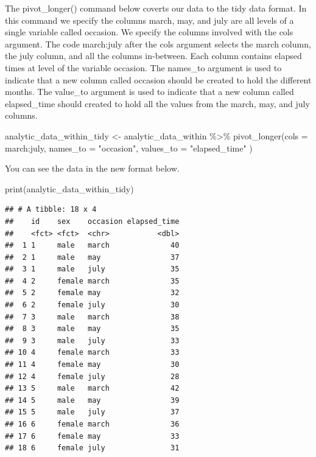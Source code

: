 \documentclass[
]{krantz}
\makeatletter
\newenvironment{Shaded}{\begin{snugshade}}{\end{snugshade}}
\newcommand{\AttributeTok}[1]{\textcolor[rgb]{0.61,0.61,0.61}{#1}}
\newcommand{\FunctionTok}[1]{\textcolor[rgb]{0,0,0}{#1}}
\newcommand{\NormalTok}[1]{#1}
\newcommand{\OtherTok}[1]{\textcolor[rgb]{0.37,0.37,0.37}{#1}}
\newcommand{\SpecialCharTok}[1]{\textcolor[rgb]{0,0,0}{#1}}
\newcommand{\StringTok}[1]{\textcolor[rgb]{0.5,0.5,0.5}{#1}}
\newenvironment{kframe}{%
\medskip{}
\setlength{\fboxsep}{.8em}
 \def\at@end@of@kframe{}%
 \ifinner\ifhmode%
  \def\at@end@of@kframe{\end{minipage}}%
  \begin{minipage}{\columnwidth}%
 \fi\fi%
 \def\FrameCommand##1{\hskip\@totalleftmargin \hskip-\fboxsep
 \colorbox{shadecolor}{##1}\hskip-\fboxsep
     \hskip-\linewidth \hskip-\@totalleftmargin \hskip\columnwidth}%
 \MakeFramed {\advance\hsize-\width
   \@totalleftmargin\z@ \linewidth\hsize
   \@setminipage}}%
 {\par\unskip\endMakeFramed%
 \at@end@of@kframe}
\renewenvironment{Shaded}{\begin{kframe}}{\end{kframe}}
\makeatother
\begin{document}
The pivot\_longer() command below coverts our data to the tidy data format. In this command we specify the columns march, may, and july are all levels of a single variable called occasion. We specify the columns involved with the cols argument. The code march:july after the cols argument selects the march column, the july column, and all the columns in-between. Each column contains elapsed times at level of the variable occasion. The names\_to argument is used to indicate that a new column called occasion should be created to hold the different months. The value\_to argument is used to indicate that a new column called elapsed\_time should created to hold all the values from the march, may, and july columns.

\begin{Shaded}
\begin{Highlighting}[]
\NormalTok{analytic\_data\_within\_tidy }\OtherTok{\textless{}{-}}\NormalTok{ analytic\_data\_within }\SpecialCharTok{\%\textgreater{}\%}
  \FunctionTok{pivot\_longer}\NormalTok{(}\AttributeTok{cols =}\NormalTok{ march}\SpecialCharTok{:}\NormalTok{july,}
               \AttributeTok{names\_to =} \StringTok{"occasion"}\NormalTok{,}
               \AttributeTok{values\_to =} \StringTok{"elapsed\_time"}
\NormalTok{  )}
\end{Highlighting}
\end{Shaded}

You can see the data in the new format below.

\begin{Shaded}
\begin{Highlighting}[]
\FunctionTok{print}\NormalTok{(analytic\_data\_within\_tidy)}
\end{Highlighting}
\end{Shaded}

\begin{verbatim}
## # A tibble: 18 x 4
##    id    sex    occasion elapsed_time
##    <fct> <fct>  <chr>           <dbl>
##  1 1     male   march              40
##  2 1     male   may                37
##  3 1     male   july               35
##  4 2     female march              35
##  5 2     female may                32
##  6 2     female july               30
##  7 3     male   march              38
##  8 3     male   may                35
##  9 3     male   july               33
## 10 4     female march              33
## 11 4     female may                30
## 12 4     female july               28
## 13 5     male   march              42
## 14 5     male   may                39
## 15 5     male   july               37
## 16 6     female march              36
## 17 6     female may                33
## 18 6     female july               31
\end{verbatim}
\end{document}
